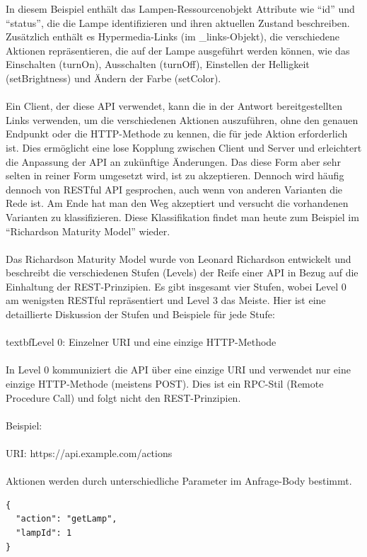 In diesem Beispiel enthält das Lampen-Ressourcenobjekt Attribute wie \enquote{id} und \enquote{status}, die die Lampe identifizieren und ihren aktuellen Zustand beschreiben. Zusätzlich enthält es Hypermedia-Links (im \_links-Objekt), die verschiedene Aktionen repräsentieren, die auf der Lampe ausgeführt werden können, wie das Einschalten (turnOn), Ausschalten (turnOff), Einstellen der Helligkeit (setBrightness) und Ändern der Farbe (setColor).
\\\\
Ein Client, der diese API verwendet, kann die in der Antwort bereitgestellten Links verwenden, um die verschiedenen Aktionen auszuführen, ohne den genauen Endpunkt oder die HTTP-Methode zu kennen, die für jede Aktion erforderlich ist. Dies ermöglicht eine lose Kopplung zwischen Client und Server und erleichtert die Anpassung der API an zukünftige Änderungen. Das diese Form aber sehr selten in reiner Form umgesetzt wird, ist zu akzeptieren. Dennoch wird häufig dennoch von RESTful API gesprochen, auch wenn von anderen Varianten die Rede ist. Am Ende hat man den Weg akzeptiert und versucht die vorhandenen Varianten zu klassifizieren. Diese Klassifikation findet man heute zum Beispiel im \enquote{Richardson Maturity Model} wieder. 
\\\\
Das Richardson Maturity Model wurde von Leonard Richardson entwickelt und beschreibt die verschiedenen Stufen (Levels) der Reife einer API in Bezug auf die Einhaltung der REST-Prinzipien. Es gibt insgesamt vier Stufen, wobei Level 0 am wenigsten RESTful repräsentiert und Level 3 das Meiste. Hier ist eine detaillierte Diskussion der Stufen und Beispiele für jede Stufe:
\\\\
textbf{Level 0}: Einzelner URI und eine einzige HTTP-Methode
\\\\
In Level 0 kommuniziert die API über eine einzige URI und verwendet nur eine einzige HTTP-Methode (meistens POST). Dies ist ein RPC-Stil (Remote Procedure Call) und folgt nicht den REST-Prinzipien.
\\\\
Beispiel:
\\\\
URI: https://api.example.com/actions
\\\\
Aktionen werden durch unterschiedliche Parameter im Anfrage-Body bestimmt.\\ 
\noindent\begin{minipage}{\textwidth}
\begin{lstlisting}[caption={Level 0},captionpos=b,label={lst:level_0}]
{
  "action": "getLamp",
  "lampId": 1
}
\end{lstlisting}
\end{minipage}

